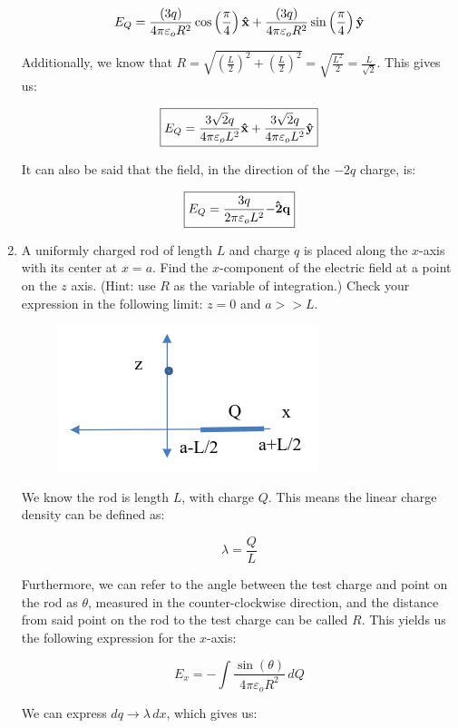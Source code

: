 \begin{enumerate}
    $$E_Q=\frac{(3q)}{4\pi\varepsilon_o R^2}\cos\left( \frac{\pi}{4} \right)\bold{\hat{x}}+\frac{(3q)}{4\pi\varepsilon_o R^2}\sin\left( \frac{\pi}{4} \right)\bold{\hat{y}}$$

    Additionally, we know that $R=\sqrt{\left( \frac{L}{2} \right)^2+\left( \frac{L}{2} \right)^2}=\sqrt{\frac{L^2}{2}}=\frac{L}{\sqrt{2}}$. This gives us:

    $$\boxed{E_Q=\frac{3\sqrt{2}q}{4\pi\varepsilon_o L^2}\bold{\hat{x}}+\frac{3\sqrt{2}q}{4\pi\varepsilon_o L^2}\bold{\hat{y}}}$$

    It can also be said that the field, in the direction of the $-2q$ charge, is:

    $$\boxed{E_Q=\frac{3q}{2\pi\varepsilon_o L^2}\bold{\hat{-2q}}}$$

  \item A uniformly charged rod of length $L$ and charge $q$ is placed along the $x$-axis with its center at $x=a$. Find the $x$-component of the electric field at a point on the $z$ axis. (Hint: use $R$ as the variable of integration.) Check your expression in the following limit: $z=0$ and $a>>L$.

    \begin{center}
      \begin{figure}[H]
        \centering
        \includegraphics[width=.4\textwidth]{Figures/Figure2-2.png}
        \label{fig:2}
      \end{figure}
    \end{center}

    We know the rod is length $L$, with charge $Q$. This means the linear charge density can be defined as:

    $$\lambda=\frac{Q}{L}$$

    Furthermore, we can refer to the angle between the test charge and point on the rod as $\theta$, measured in the counter-clockwise direction, and the distance from said point on the rod to the test charge can be called $R$. This yields us the following expression for the $x$-axis:

    $$E_x=-\int \frac{\sin(\theta)}{4\pi\varepsilon_oR^2}\,dQ$$

    We can express $dq\rightarrow \lambda\,dx$, which gives us:


\end{enumerate}
